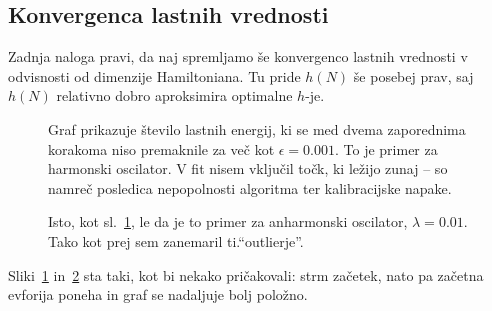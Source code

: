 \documentclass[a4 paper, 12pt]{article}
\begin{document}
\subsection{Konvergenca lastnih vrednosti}

Zadnja naloga pravi, da naj spremljamo še konvergenco lastnih vrednosti v odvisnosti od dimenzije Hamiltoniana. Tu pride
$h(N)$ še posebej prav, saj $h(N)$ relativno dobro aproksimira optimalne $h$-je.

\begin{figure}[H]
	\begin{center}
		
	\end{center}
	\vspace{-20pt}
	\caption{Graf prikazuje število lastnih energij, ki se med dvema zaporednima korakoma niso premaknile za več kot
	$\epsilon = 0.001$. To je primer za harmonski oscilator. V fit nisem vključil točk, ki ležijo zunaj -- so namreč
	posledica nepopolnosti algoritma ter kalibracijske napake.}
	\label{Lambda0}
	\vspace{-10pt}
\end{figure}

\begin{figure}[H]
	\begin{center}
		
	\end{center}
	\vspace{-20pt}
	\caption{Isto, kot sl.~\ref{Lambda0}, le da je to primer za anharmonski oscilator, $\lambda = 0.01$. Tako kot prej
	sem zanemaril ti."`outlierje"'.}
	\label{Lambda1}
	\vspace{-10pt}
\end{figure}

Sliki~\ref{Lambda0} in~\ref{Lambda1} sta taki, kot bi nekako pričakovali: strm začetek, nato pa začetna evforija poneha
in graf se nadaljuje bolj položno.
\end{document}
